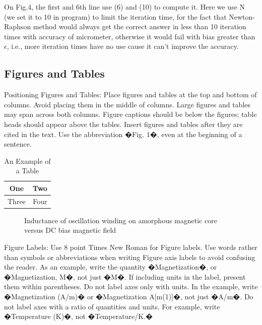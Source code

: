 \documentclass[letterpaper, 10 pt, conference]{ieeeconf}  %
\begin{document}
On Fig.4, the first and 6th line use (6) and (10) to compute it. Here we use N (we set it to 10 in program) to limit the iteration time, for the fact that Newton-Raphson method would always get the correct answer in less than 10 iteration times with accuracy of micrometer, otherwise it would fail with bias greater than $\epsilon$, i.e., more iteration times have no use cause it can't improve the accuracy.  

\subsection{Figures and Tables}

Positioning Figures and Tables: Place figures and tables at the top and bottom of columns. Avoid placing them in the middle of columns. Large figures and tables may span across both columns. Figure captions should be below the figures; table heads should appear above the tables. Insert figures and tables after they are cited in the text. Use the abbreviation �Fig. 1�, even at the beginning of a sentence.

\begin{table}[h]
\caption{An Example of a Table}
\label{table_example}
\begin{center}
\begin{tabular}{|c||c|}
\hline
One & Two\\
\hline
Three & Four\\
\hline
\end{tabular}
\end{center}
\end{table}


   \begin{figure}[thpb]
      \centering
      \caption{Inductance of oscillation winding on amorphous
       magnetic core versus DC bias magnetic field}
      \label{figurelabel}
   \end{figure}
   

Figure Labels: Use 8 point Times New Roman for Figure labels. Use words rather than symbols or abbreviations when writing Figure axis labels to avoid confusing the reader. As an example, write the quantity �Magnetization�, or �Magnetization, M�, not just �M�. If including units in the label, present them within parentheses. Do not label axes only with units. In the example, write �Magnetization (A/m)� or �Magnetization {A[m(1)]}�, not just �A/m�. Do not label axes with a ratio of quantities and units. For example, write �Temperature (K)�, not �Temperature/K.�
\end{document}
